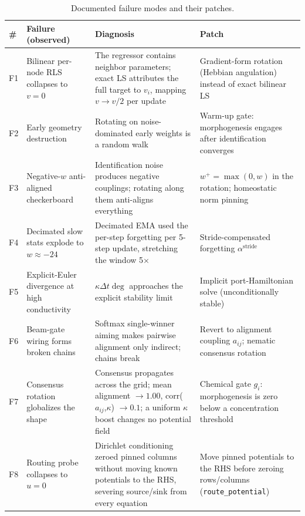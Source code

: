 \documentclass[conference]{IEEEtran}
\begin{document}
\begin{table}[t]
\centering\footnotesize
\caption{Documented failure modes and their patches.}
\label{tab:fail}
\begin{tabular}{L{1.0cm}L{4.2cm}L{5.6cm}L{5.6cm}}
\toprule
\# & Failure (observed) & Diagnosis & Patch \\
\midrule
F1 & Bilinear per-node RLS collapses to $v = 0$ & The regressor contains neighbor parameters; exact LS attributes the full target to $v_i$, mapping $v \to v/2$ per update & Gradient-form rotation (Hebbian angulation) instead of exact bilinear LS \\
F2 & Early geometry destruction & Rotating on noise-dominated early weights is a random walk & Warm-up gate: morphogenesis engages after identification converges \\
F3 & Negative-$w$ anti-aligned checkerboard & Identification noise produces negative couplings; rotating along them anti-aligns everything & $w^{+} = \max(0, w)$ in the rotation; homeostatic norm pinning \\
F4 & Decimated slow stats explode to $w \approx -24$ & Decimated EMA used the per-step forgetting per 5-step update, stretching the window 5$\times$ & Stride-compensated forgetting $\alpha^{\mathrm{stride}}$ \\
F5 & Explicit-Euler divergence at high conductivity & $\kappa \Delta t \deg$ approaches the explicit stability limit & Implicit port-Hamiltonian solve (unconditionally stable) \\
F6 & Beam-gate wiring forms broken chains & Softmax single-winner aiming makes pairwise alignment only indirect; chains break & Revert to alignment coupling $a_{ij}$; nematic consensus rotation \\
F7 & Consensus rotation globalizes the shape & Consensus propagates across the grid; mean alignment $\to 1.00$, corr($a_{ij}$,$\kappa$) $\to 0.1$; a uniform $\kappa$ boost changes no potential field & Chemical gate $g_i$: morphogenesis is zero below a concentration threshold \\
F8 & Routing probe collapses to $u = 0$ & Dirichlet conditioning zeroed pinned columns without moving known potentials to the RHS, severing source/sink from every equation & Move pinned potentials to the RHS before zeroing rows/columns (\texttt{route\_potential}) \\
\bottomrule
\end{tabular}
\end{table}
\end{document}
